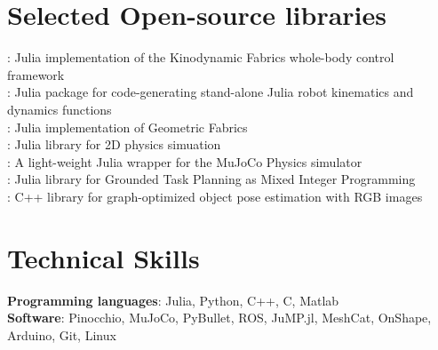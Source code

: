 \documentclass[letterpaper,11pt]{article}
\begin{document}
 
\section{\color{blue}Selected Open-source libraries}
 \begin{itemize}[leftmargin=0.15in, label={}]
    \small{\item{
    \textbf{\href{https://github.com/adubredu/KinodynamicFabrics.jl}{\color{blue}{KinodynamicFabrics.jl}} }{: Julia implementation of the Kinodynamic Fabrics whole-body control framework}  \\
    \textbf{\href{https://github.com/adubredu/Dynamatics.jl}{\color{blue}{Dynamatics.jl}} }{: Julia package for code-generating stand-alone Julia robot kinematics and dynamics functions}  \\
    \textbf{\href{https://github.com/adubredu/Fabrics.jl}{\color{blue}{Fabrics.jl}} }{: Julia implementation of Geometric Fabrics}  \\
     \textbf{\href{https://github.com/adubredu/contact_sim.jl}{\color{blue}{contact\_sim.jl}} }{: Julia library for 2D physics simuation}  \\
     \textbf{\href{https://github.com/adubredu/MuJoCo.jl}{\color{blue}{MuJoCo.jl}} }{: A light-weight Julia wrapper for the MuJoCo Physics simulator}  \\
     \textbf{\href{https://github.com/adubredu/gtpmip.jl}{\color{blue}{gtpmip.jl}} }{: Julia library for Grounded Task Planning as Mixed Integer Programming}  \\ 
     \textbf{\href{https://github.com/adubredu/godsacstar}{\color{blue}{godsacstar}} }{: C++ library for graph-optimized object pose estimation with RGB images}  \\
    }}
 \end{itemize}
%
\section{\color{blue}Technical Skills}
 \begin{itemize}[leftmargin=0.15in, label={}]
    \small{\item{
     \textbf{Programming languages}{: Julia, Python, C++, C, Matlab}\\
      \textbf{Software}{: Pinocchio, MuJoCo, PyBullet, ROS, JuMP.jl, MeshCat, OnShape, Arduino, Git, Linux} 
    }}
 \end{itemize}
 

\end{document}
